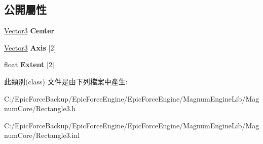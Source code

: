 \subsection*{公開屬性}
\begin{DoxyCompactItemize}
\item 
\hyperlink{class_magnum_1_1_vector3}{Vector3} {\bfseries Center}\hypertarget{class_magnum_1_1_rectangle3_a991ccb943da4403d7b8e86aacb9c9251}{}\label{class_magnum_1_1_rectangle3_a991ccb943da4403d7b8e86aacb9c9251}

\item 
\hyperlink{class_magnum_1_1_vector3}{Vector3} {\bfseries Axis} \mbox{[}2\mbox{]}\hypertarget{class_magnum_1_1_rectangle3_abc921543ce1c0b41976602c10f5e9c1a}{}\label{class_magnum_1_1_rectangle3_abc921543ce1c0b41976602c10f5e9c1a}

\item 
float {\bfseries Extent} \mbox{[}2\mbox{]}\hypertarget{class_magnum_1_1_rectangle3_acb4fcbcefe10d7e79c66074aa65652af}{}\label{class_magnum_1_1_rectangle3_acb4fcbcefe10d7e79c66074aa65652af}

\end{DoxyCompactItemize}


此類別(class) 文件是由下列檔案中產生\+:\begin{DoxyCompactItemize}
\item 
C\+:/\+Epic\+Force\+Backup/\+Epic\+Force\+Engine/\+Epic\+Force\+Engine/\+Magnum\+Engine\+Lib/\+Magnum\+Core/Rectangle3.\+h\item 
C\+:/\+Epic\+Force\+Backup/\+Epic\+Force\+Engine/\+Epic\+Force\+Engine/\+Magnum\+Engine\+Lib/\+Magnum\+Core/Rectangle3.\+inl\end{DoxyCompactItemize}
